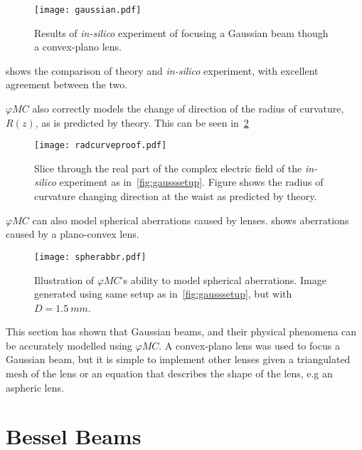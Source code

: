 \begin{figure}[!htpb]
    \centering
    \texttt{[image: gaussian.pdf]}
    \caption{Results of \textit{in-silico} experiment of focusing a Gaussian beam though a convex-plano lens.}
    \label{fig:simgaussexp}
\end{figure}


 shows the comparison of theory and \textit{in-silico} experiment, with excellent agreement between the two.

$\varphi MC$ also correctly models the change of direction of the radius of curvature, $R(z)$, as is predicted by theory.
This can be seen in~\cref{fig:proofchgrz}

\begin{figure}[!htpb]
    \centering
    \texttt{[image: radcurveproof.pdf]}
    \caption{Slice through the real part of the complex electric field of the \textit{in-silico} experiment as in~\cref{fig:gausssetup}. Figure shows the radius of curvature changing direction at the waist as predicted by theory.}
    \label{fig:proofchgrz}
\end{figure}

$\varphi MC$ can also model spherical aberrations caused by lenses.
 shows aberrations caused by a plano-convex lens.

\begin{figure}[!hbtp]
    \centering
    \texttt{[image: spherabbr.pdf]}
    \caption{Illustration of $\varphi MC$'s ability to model spherical aberrations. Image generated using same setup as in~\cref{fig:gausssetup}, but with $D=1.5~mm$.}
    \label{fig:spheraberr}
\end{figure}


This section has shown that Gaussian beams, and their physical phenomena can be accurately modelled using $\varphi MC$.
A convex-plano lens was used to focus a Gaussian beam, but it is simple to implement other lenses given a triangulated mesh of the lens or an equation that describes the shape of the lens, e.g an aspheric lens.
\FloatBarrier

\section{Bessel Beams}

